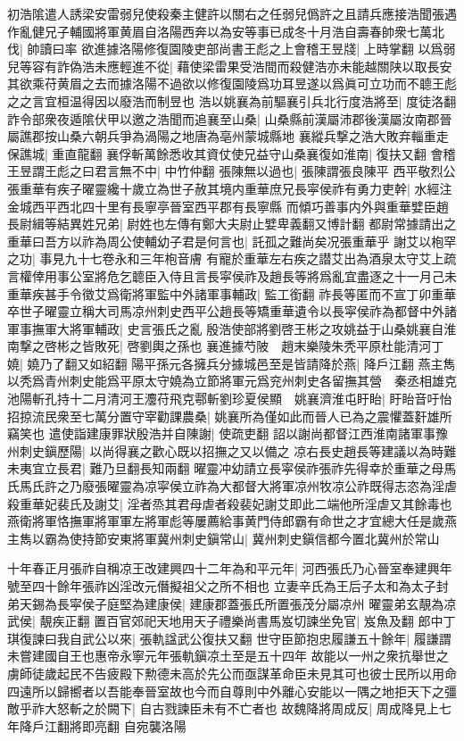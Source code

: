 初浩隂遣人誘梁安雷弱兒使殺秦主健許以關右之任弱兒僞許之且請兵應接浩聞張遇作亂健兄子輔國將軍黄眉自洛陽西奔以為安等事已成冬十月浩自壽春帥衆七萬北伐|{
	帥讀曰率}
欲進據洛陽修復園陵吏部尚書王彪之上會稽王昱牋|{
	上時掌翻}
以爲弱兒等容有詐偽浩未應輕進不從|{
	藉使梁雷果受浩間而殺健浩亦未能越關陕以取長安其欲乘苻黄眉之去而據洛陽不過欲以修復園陵爲功耳昱遂以爲眞可立功而不聼王彪之之言宜桓温得因以廢浩而制昱也}
浩以姚襄為前驅襄引兵北行度浩將至|{
	度徒洛翻}
詐令部衆夜遁隂伏甲以邀之浩聞而追襄至山桑|{
	山桑縣前漢屬沛郡後漢屬汝南郡晉屬譙郡按山桑六朝兵爭為渦陽之地唐為亳州蒙城縣地}
襄縱兵撃之浩大敗弃輜重走保譙城|{
	重直龍翻}
襄俘斬萬餘悉收其資仗使兄益守山桑襄復如淮南|{
	復扶又翻}
會稽王昱謂王彪之曰君言無不中|{
	中竹仲翻}
張陳無以過也|{
	張陳謂張良陳平}
西平敬烈公張重華有疾子曜靈纔十歲立為世子赦其境内重華庶兄長寜侯祚有勇力吏幹|{
	水經注金城西平西北四十里有長寧亭晉室西平郡有長寧縣}
而傾巧善事内外與重華嬖臣趙長尉緝等結異姓兄弟|{
	尉姓也左傳有鄭大夫尉止嬖卑義翻又博計翻}
都尉常據請出之重華曰吾方以祚為周公使輔幼子君是何言也|{
	託孤之難尚矣况張重華乎}
謝艾以枹罕之功|{
	事見九十七卷永和三年枹音膚}
有寵於重華左右疾之譛艾出為酒泉太守艾上疏言權倖用事公室將危乞聼臣入侍且言長寜侯祚及趙長等將爲亂宜盡逐之十一月己未重華疾甚手令徵艾爲衛將軍監中外諸軍事輔政|{
	監工銜翻}
祚長等匿而不宣丁卯重華卒世子曜靈立稱大司馬凉州刺史西平公趙長等矯重華遺令以長寜侯祚為都督中外諸軍事撫軍大將軍輔政|{
	史言張氏之亂}
殷浩使部將劉啓王彬之攻姚益于山桑姚襄自淮南撃之啓彬之皆敗死|{
	啓劉輿之孫也}
襄進據芍陂　趙末樂陵朱秃平原杜能清河丁嬈|{
	嬈乃了翻又如紹翻}
陽平孫元各擁兵分據城邑至是皆請降於燕|{
	降戶江翻}
燕主雋以秃爲青州刺史能爲平原太守嬈為立節將軍元爲兖州刺史各留撫其營　秦丞相雄克池陽斬孔持十二月清河王灋苻飛克鄠斬劉珍夏侯顯　姚襄濟淮屯盱眙|{
	盱眙音吁怡}
招掠流民衆至七萬分置守宰勸課農桑|{
	姚襄所為僅如此而晉人已為之震懼蓋姧雄所竊笑也}
遣使詣建康罪狀殷浩并自陳謝|{
	使疏吏翻}
詔以謝尚都督江西淮南諸軍事豫州刺史鎭歷陽|{
	以尚得襄之歡心既以招撫之又以備之}
凉右長史趙長等建議以為時難未夷宜立長君|{
	難乃旦翻長知兩翻}
曜靈冲幼請立長寜侯祚張祚先得幸於重華之母馬氏馬氏許之乃廢張曜靈為凉寜侯立祚為大都督大將軍凉州牧凉公祚既得志恣為淫虐殺重華妃裴氏及謝艾|{
	淫者烝其君母虐者殺裴妃謝艾即此二端他所淫虐又其餘毒也}
燕衛將軍恪撫軍將軍軍左將軍彪等屢薦給事黄門侍郎霸有命世之才宜總大任是歲燕主雋以霸為使持節安東將軍冀州刺史鎭常山|{
	冀州刺史鎭信都今置北冀州於常山}


十年春正月張祚自稱凉王改建興四十二年為和平元年|{
	河西張氏乃心晉室奉建興年號至四十餘年張祚凶淫改元僭擬祖父之所不相也}
立妻辛氏為王后子太和為太子封弟天錫為長寜侯子庭堅為建康侯|{
	建康郡蓋張氏所置張茂分屬凉州}
曜靈弟玄靚為凉武侯|{
	靚疾正翻}
置百官郊祀天地用天子禮樂尚書馬岌切諫坐免官|{
	岌魚及翻}
郎中丁琪復諫曰我自武公以來|{
	張軌諡武公復扶又翻}
世守臣節抱忠履謙五十餘年|{
	履謙謂未嘗建國自王也惠帝永寧元年張軌鎭凉土至是五十四年}
故能以一州之衆抗舉世之虜師徒歲起民不告疲殿下勲德未高於先公而亟謀革命臣未見其可也彼士民所以用命四遠所以歸嚮者以吾能奉晉室故也今而自尊則中外離心安能以一隅之地拒天下之彊敵乎祚大怒斬之於闕下|{
	自古戮諫臣未有不亡者也}
故魏降將周成反|{
	周成降見上七年降戶江翻將即亮翻}
自宛襲洛陽

